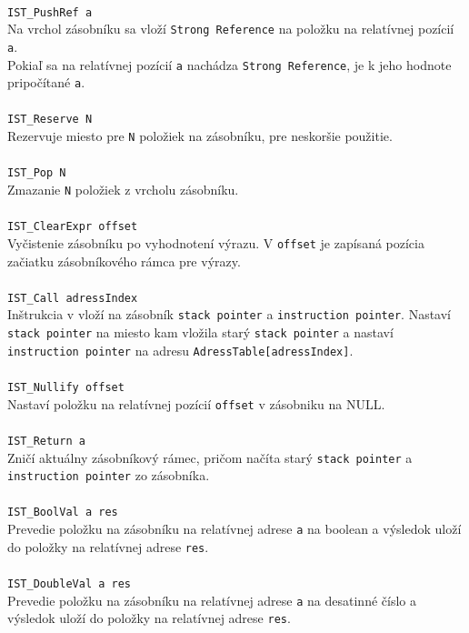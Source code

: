 \documentclass[12pt,a4paper,titlepage,final]{article}
\begin{document}
\\\texttt{IST\_PushRef a}\\
Na vrchol zásobníku sa vloží \texttt{Strong Reference} na položku na relatívnej pozícií \texttt{a}.\\
Pokiaľ sa na relatívnej pozícií \texttt{a} nachádza \texttt{Strong Reference}, je k jeho hodnote pripočítané \texttt{a}.\\
\\\texttt{IST\_Reserve N}\\
Rezervuje miesto pre \texttt{N} položiek na zásobníku, pre neskoršie použitie.\\
\\\texttt{IST\_Pop N}\\
Zmazanie \texttt{N} položiek z vrcholu zásobníku.\\
\\\texttt{IST\_ClearExpr offset} \\
Vyčistenie zásobníku po vyhodnotení výrazu. V \texttt{offset} je zapísaná pozícia začiatku zásobníkového rámca pre výrazy.\\
\\\texttt{IST\_Call adressIndex}\\
Inštrukcia v vloží na zásobník \texttt{stack pointer} a \texttt{instruction pointer}. Nastaví
\texttt{stack pointer} na miesto kam vložila starý \texttt{stack pointer} a nastaví \texttt{instruction pointer} na adresu
\texttt{AdressTable[adressIndex]}.\\
\\\texttt{IST\_Nullify offset}\\
Nastaví položku na relatívnej pozícií \texttt{offset} v zásobniku na NULL.\\
\\\texttt{IST\_Return a } \\
Zničí aktuálny zásobníkový rámec, pričom načíta starý \texttt{stack pointer} a \texttt{instruction pointer} zo zásobníka.\\
\\\texttt{IST\_BoolVal a res } \\
Prevedie položku na zásobníku na relatívnej adrese \texttt{a} na boolean a výsledok uloží do položky na relatívnej adrese \texttt{res}.\\
\\\texttt{IST\_DoubleVal a res } \\
Prevedie položku na zásobníku na relatívnej adrese \texttt{a} na desatinné číslo a výsledok uloží do položky na relatívnej adrese \texttt{res}.\\
\end{document}
